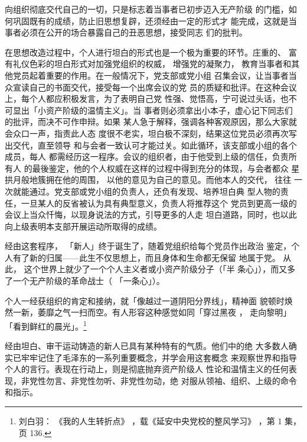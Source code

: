 向组织彻底交代自己的一切，只是标志着当事者已初步迈入无产阶级
的门槛，如何巩固既有的成绩，防止旧思想复辟，还须经由一定的形式才
能完成，这就是当事者必须在公开的场合暴露自己的丑恶思想，接受同志
们的批判。

在思想改造过程中，个人进行坦白的形式也是一个极为重要的环节。庄重的、 富
有礼仪色彩的坦白形式对加强党组织的权威， 增强党的凝聚力， 教育当事者和其
他党员起着重要的作用。在一般情况下，党支部或党小组 召集会议，让当事者当
众宣读自己的书面交代，接受每一个出席会议的党 员的质疑和批评。在这种会议
上，每个人都应积极发言，为了表明自己党 性强、觉悟高，宁可说过头话，也不
可显出「小资产阶级的温情主义」。当 事者则必须拿出小本子，虚心记下同志们
的批评，而决不可作申辩。如果 某人急于解释，强调各种客观原因，那么大家就
会众口一声，指责此人态 度很不老实，坦白极不深刻，结果这位党员必须再次写
出交代，直至领导 和与会者一致认可才能过关。如此循环，该支部或小组的各个
成员，每人 都需经历这一程序。会议的组织者，由于他受到上级的信任，负责所
有人 的最後鉴定，他的个人权威在这样的过程中得到充分的体现，与会者都众 星
拱月般地簇拥在他的周围， 以他的意见为自己的意见。而他本人的交代， 往往
一次就能通过。党支部或党小组的负责人，还负有发现、培养坦白典 型人物的责
任，一旦某人的反省被认为具有典型意义，负责人将推荐这个 党员到更高一级的
会议上当众忏悔，以现身说法的方式，引导更多的人走 坦白道路，同时，也以此
向上级表明本支部开展运动所取得的成绩。

经由这套程序，
「新人」终于诞生了，随着党组织给每个党员作出政治
鉴定，个人有了新的归属——此生不仅思想上，而且身体和生命都无保留
地属于党。
从此，
这个世界上就少了一个个人主义者或小资产阶级分子（「半
条心」），而又多了一个无产阶级的革命战士（ 「一条心」）。

个人一经获组织的肯定和接纳，就「像越过一道阴阳分界线」，精神面 貌顿时焕
然一新，萎靡之气一扫而空。有人形容这种感觉如同「穿过黑夜 ， 走向黎明」
「看到鲜红的晨光」。\footnote{ 刘白羽：
《我的人生转折点》
，载《延安中央党校的整风学习》
，第 1 集，页 136.} 

经由坦白、审干运动铸造的新人已具有某种特有的气质。他们中的绝
大多数人确实已牢牢记住了毛泽东的一系列重要概念，并学会用这套概念
来观察世界和指导个人的言行。表现在行动上，则是彻底抛弃资产阶级人
性论和温情主义的任何表现，非党性勿言、非党性勿听、非党性勿动，绝
对服从领袖、组织、上级的命令和指示。


